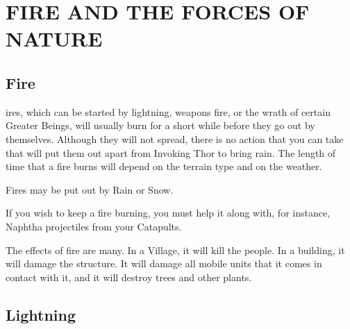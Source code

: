 
\chapter[Fire and the Forces of Nature]{{\Huge F}IRE AND THE {\Huge F}ORCES OF {\Huge N}ATURE}

\section{\textsf{Fire}}


ires, which can be started by lightning, weapons fire, or the wrath of certain Greater Beings, will usually burn for a short while before they go out by themselves. Although they will not spread, there is no action that you can take that will put them out apart from Invoking Thor to bring rain. The length of time that a fire burns will depend on the terrain type and on the weather.

Fires may be put out by Rain or Snow.

If you wish to keep a fire burning, you must help it along with, for instance, Naphtha projectiles from your Catapults.

The effects of fire are many. In a Village, it will kill the people. In a building, it will damage the structure. It will damage all mobile units that it comes in contact with it, and it will destroy trees and other plants.

\section{\textsf{Lightning}}


